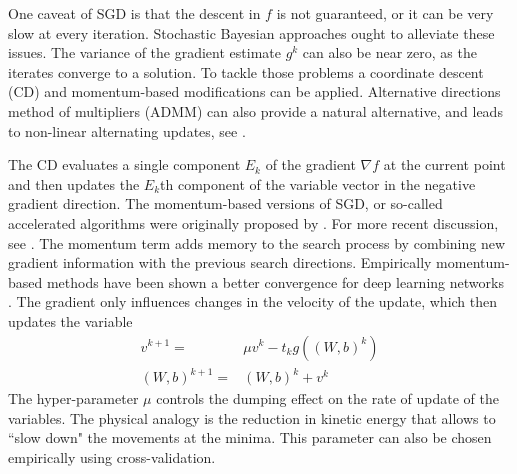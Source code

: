 \documentclass[12pt]{article}
\begin{document}
One caveat of SGD is that the descent in $f$ is not guaranteed, or it can be very slow at every iteration. Stochastic Bayesian approaches ought to alleviate these issues.  The variance of the gradient estimate $g^k$ can also be  near zero, as the iterates converge to a solution.  To tackle those problems a coordinate descent (CD) and momentum-based modifications  can be applied. Alternative directions method of multipliers (ADMM) can also provide a natural alternative, and leads to non-linear alternating updates, see \cite{carreira2014distributed}. 

The  CD evaluates a single component $E_k$ of the gradient $\nabla f$ at the current point and then updates the $E_k$th component of the variable vector in the negative gradient direction. The momentum-based versions of SGD, or so-called accelerated algorithms were originally proposed by  \cite{nesterov1983method}. For more recent discussion, see \cite{nesterov2013introductory}. 
The momentum term adds memory to the search process by combining  new gradient information with the previous search directions. Empirically momentum-based methods have been shown a better convergence for deep learning networks \cite{sutskever2013importance}. The gradient only influences changes in the velocity of the update, which then updates the variable
\begin{align*}
v^{k+1} =     & \mu v^k - t_k g((W,b)^k)\\
(W,b)^{k+1} = & (W,b)^k +v^k
\end{align*}
The hyper-parameter $\mu$ controls the dumping effect on the rate of update of the variables. The physical analogy is the reduction in kinetic energy that allows to ``slow down" the movements at the minima. This parameter can also be chosen empirically using cross-validation. 
\end{document}
